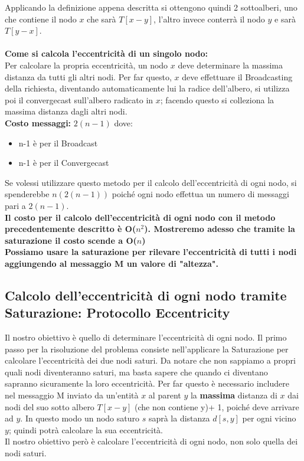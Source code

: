 Applicando la definizione appena descritta si ottengono quindi 2 sottoalberi,
uno che contiene il nodo $x$ che sarà $T[x - y]$, l'altro invece conterrà il
nodo $y$ e sarà $T[y - x]$. \\\\
\textbf{Come si calcola l'eccentricità di un singolo nodo:}\\
Per calcolare la propria eccentricità, un nodo $x$ deve determinare la massima
distanza da tutti gli altri nodi. Per far questo, $x$ deve effettuare il
Broadcasting della richiesta, diventando automaticamente lui la radice
dell'albero, si utilizza poi il convergecast sull'albero radicato in $x$;
facendo questo si colleziona la massima distanza dagli altri nodi.\\
\textbf{Costo messaggi:} $2(n-1)$ dove:
\begin{itemize}
    \item n-1 è  per il Broadcast
    \item n-1 è per il Convergecast
\end{itemize}
Se volessi utilizzare questo metodo per il calcolo dell'eccentricità di ogni
nodo, si spenderebbe $n(2(n-1))$ poiché ogni nodo effettua un numero di messaggi
pari a $2(n-1)$.\\

\textbf{Il costo per il calcolo dell'eccentricità di ogni nodo con il metodo
    precedentemente descritto è O($n^2$). Mostreremo adesso che tramite la
    saturazione il costo scende a O($n$)}\\

\textbf{Possiamo usare la saturazione per rilevare l'eccentricità di tutti i nodi aggiungendo al messaggio M un valore di "altezza".}

\subsection{Calcolo dell'eccentricità di ogni nodo tramite Saturazione: Protocollo Eccentricity}
Il nostro obiettivo è quello di determinare l'eccentricità di ogni nodo. Il
primo passo per la risoluzione del problema consiste nell'applicare la
Saturazione per calcolare l'eccentricità dei due nodi saturi. Da notare che non
sappiamo a propri quali nodi diventeranno saturi, ma basta sapere che quando ci
diventano sapranno sicuramente la loro eccentricità. Per far questo è necessario
includere nel messaggio M inviato da un'entità $x$ al parent $y$ la
\textbf{massima} distanza di $x$ dai nodi del suo sotto albero $T[x-y]$ (che non
contiene y)+ 1, poiché deve arrivare ad $y$. In questo modo un nodo saturo $s$
saprà la distanza $d[s,y]$ per ogni vicino $y$; quindi potrà calcolare la sua
eccentricità. \\
Il nostro obiettivo però è calcolare l'eccentricità di ogni nodo, non solo
quella dei nodi saturi.\\

